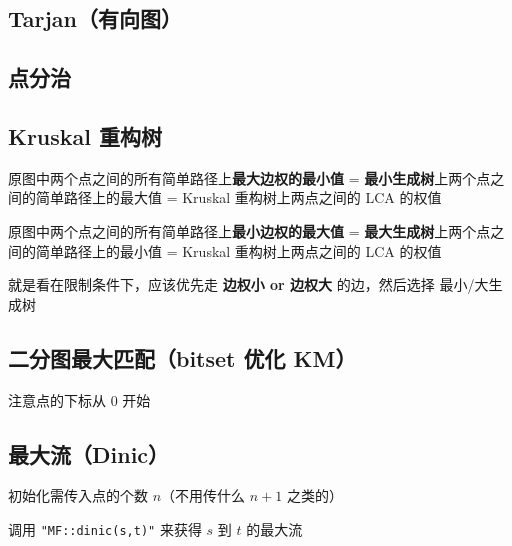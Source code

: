 \documentclass[12pt]{article}
\theoremstyle{definition}
\theoremstyle{remark}
\begin{document}
\subsection{Tarjan（有向图）}



\newpage

\subsection{点分治}



\newpage

\subsection{Kruskal 重构树}

原图中两个点之间的所有简单路径上\textbf{最大边权的最小值} = \textbf{最小生成树}上两个点之间的简单路径上的最大值 = Kruskal 重构树上两点之间的 LCA 的权值

原图中两个点之间的所有简单路径上\textbf{最小边权的最大值} = \textbf{最大生成树}上两个点之间的简单路径上的最小值 = Kruskal 重构树上两点之间的 LCA 的权值

就是看在限制条件下，应该优先走 \textbf{边权小 or 边权大} 的边，然后选择 最小/大生成树



\newpage

\subsection{二分图最大匹配（bitset 优化 KM）}

注意点的下标从 0 开始



\newpage

\subsection{最大流（Dinic）}

初始化需传入点的个数 $n$（不用传什么 $n+1$ 之类的）

调用 \texttt{"MF::dinic(s,t)"} 来获得 $s$ 到 $t$ 的最大流


\end{document}
